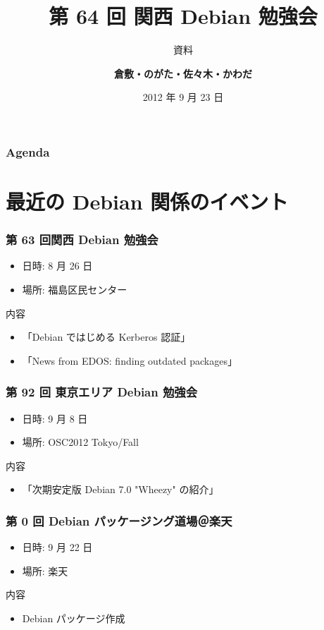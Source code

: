 \documentclass[cjk,dvipdfmx,10pt,%
hyperref={bookmarks=true,bookmarksnumbered=true,bookmarksopen=false,%
colorlinks=false,%
pdftitle={第 64 回 関西 Debian 勉強会},%
pdfauthor={倉敷・のがた・佐々木・かわだ},%
pdfsubject={資料},%
}]{beamer}
\title{第 64 回 関西 Debian 勉強会}
\subtitle{{\scriptsize 資料}}
\author[かわだ てつたろう]{{\large\bf 倉敷・のがた・佐々木・かわだ}}
\institute[Debian JP]{{\normalsize\tt 関西 Debian 勉強会}}
\date{{\small 2012 年 9 月 23 日}}
\begin{document}
\settitleslide
\begin{frame}
\titlepage
\end{frame}
\setdefaultslide

\begin{frame}[fragile]
\frametitle{Agenda}

\tableofcontents

\end{frame}

\section{最近の Debian 関係のイベント}


\begin{frame}[fragile]
\frametitle{第 63 回関西 Debian 勉強会}

\begin{itemize}
\item 日時: 8 月 26 日
\item 場所: 福島区民センター
\end{itemize}
\begin{block}{内容}
  \begin{itemize}
  \item「Debian ではじめる Kerberos 認証」
  \item 「News from EDOS: finding outdated packages」
  \end{itemize}
\end{block}
\end{frame}

\begin{frame}[fragile]
  \frametitle{第 92 回 東京エリア Debian 勉強会}
  \begin{itemize}
  \item 日時: 9 月 8 日
  \item 場所: OSC2012 Tokyo/Fall
  \end{itemize}
  \begin{block}{内容}
    \begin{itemize}
    \item 「次期安定版 Debian 7.0 "Wheezy" の紹介」
    \end{itemize}
  \end{block}
\end{frame}

\begin{frame}[fragile]
  \frametitle{第 0 回 Debian パッケージング道場＠楽天}
  \begin{itemize}
  \item 日時: 9 月 22 日
  \item 場所: 楽天
  \end{itemize}
  \begin{block}{内容}
    \begin{itemize}
    \item Debian パッケージ作成
    \end{itemize}
  \end{block}
\end{frame}
\end{document}
